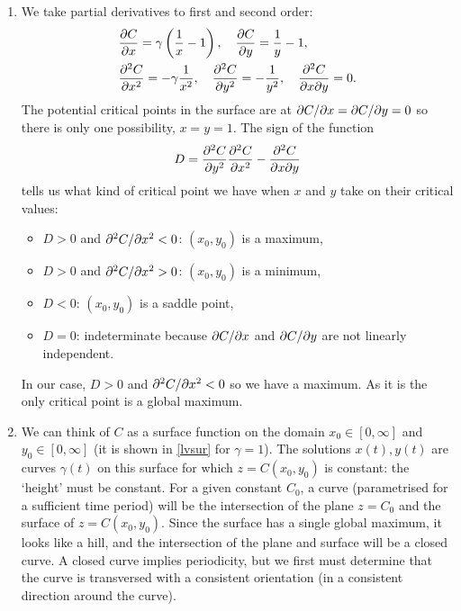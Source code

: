 \documentclass[a4paper, 12pt]{article}
\begin{document}
\begin{enumerate}[label={\bf \arabic{*}.\;}, ref={\arabic{*}},itemsep=3ex, left=0ex]
{      \begin{enumerate}[label=(\alph*)]
        \item We take partial derivatives to first and second order:
          \begin{align}
            &\pd{C}{x}=\gamma\left(\frac{1}{x} - 1\right),\quad   \pd{C}{y}  = \frac{1}{y} - 1,\\
            &\pdd{C}{x} = -\gamma\frac{1}{x^2},\quad  \pdd{C}{y} = -\frac{1}{y^2},\quad \pddmixed{C}{x}{y} = 0.
          \end{align}
          The potential critical points in the surface are at $\pd{C}{x} =\pd{C}{y}=0$ so there is only one possibility, $x=y=1$. The sign of the function
          \begin{equation}
            D = \pdd{C}{y}\pdd{C}{x} - \pddmixed{C}{x}{y}
          \end{equation}
          tells us what kind of critical point we have when $x$ and $y$ take on their critical values:
          \begin{itemize}
            \item $D>0$ and $\pdd{C}{x}<0$: $(x_0,y_0)$ is a maximum,
            \item $D>0$ and $\pdd{C}{x}>0$: $(x_0,y_0)$ is a minimum,
            \item $D<0$: $(x_0,y_0)$ is a saddle point,
            \item $D=0$: indeterminate because $\pd{C}{x}$ and $\pd{C}{y}$ are not linearly independent.
          \end{itemize}
          In our case, $D>0$ and $\pdd{C}{x}<0$ so we have a maximum. As it is the only critical point is a global maximum.

        \item We can think of $C$ as a surface function on the domain $x_0\in[0,\infty]$ and $y_0\in[0,\infty]$ (it is shown in \cref{lvsur} for $\gamma=1$). The solutions $x(t),y(t)$ are curves $\gamma(t)$ on this surface for which $z = C(x_0,y_0)$ is constant: the `height' must be constant. For a given constant $C_0$, a curve (parametrised for a sufficient time period) will be the intersection of the plane $z=C_0$ and the surface of $z = C(x_0,y_0)$. Since the surface has a single global maximum, it looks like a hill, and the intersection of the plane and surface will be a closed curve. A closed curve implies periodicity, but we first must determine that the curve is transversed with a consistent orientation (in a consistent direction around the curve).


\end{enumerate}}
\end{enumerate}
\end{document}
